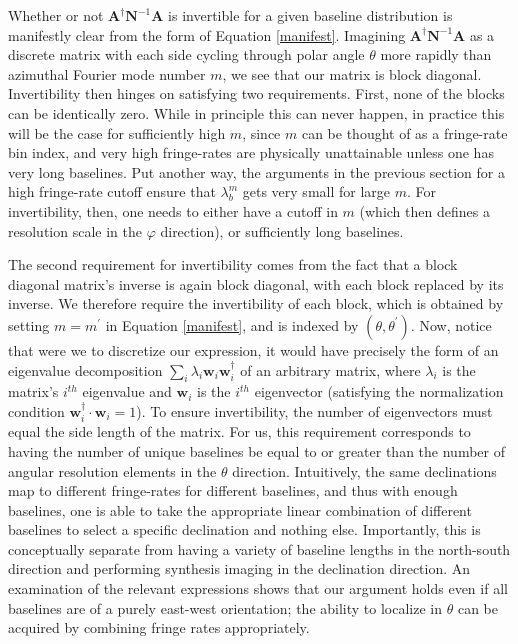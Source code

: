 \documentclass[twocolumn,apj,numberedappendix]{emulateapj}
\newcommand{\A}{\mathbf{A}}
\newcommand{\N}{\mathbf{N}}
\begin{document}
Whether or not $\A^\dagger \N^{-1} \A$ is invertible for a given baseline
distribution is manifestly clear from the form of Equation \eqref{manifest}.
Imagining $\A^\dagger \N^{-1} \A$ as a discrete matrix with each side cycling
through polar angle $\theta$ more rapidly than azimuthal Fourier mode number
$m$, we see that our matrix is block diagonal.  Invertibility then hinges on
satisfying two requirements.  First, none of the blocks can be identically
zero.  While in principle this can never happen, in practice this will be the
case for sufficiently high $m$, since $m$ can be thought of as a fringe-rate
bin index, and very high fringe-rates are physically unattainable unless one
has very long baselines.  Put another way, the arguments in the previous
section for a high fringe-rate cutoff ensure that $\lambda_b^m$ gets very small
for large $m$.  For invertibility, then, one needs to either have a cutoff in
$m$ (which then defines a resolution scale in the $\varphi$ direction), or
sufficiently long baselines.

The second requirement for invertibility comes from the fact that a block
diagonal matrix's inverse is again block diagonal, with each block replaced by
its inverse.  We therefore require the invertibility of each block, which is
obtained by setting $m=m^\prime$ in Equation \eqref{manifest}, and is indexed
by $(\theta, \theta^\prime)$.  Now, notice that were we to discretize our
expression, it would have precisely the form of an eigenvalue decomposition
$\sum_i \lambda_i \mathbf{w}_i \mathbf{w}_i^\dagger$ of an arbitrary matrix,
where $\lambda_i$ is the matrix's $i^{th}$ eigenvalue and $\mathbf{w}_i$ is the
$i^{th}$ eigenvector (satisfying the normalization condition
$\mathbf{w}_i^\dagger \cdot \mathbf{w}_i = 1$).  To ensure invertibility, the
number of eigenvectors must equal the side length of the matrix.  For us, this
requirement corresponds to having the number of unique baselines be equal to or
greater than the number of angular resolution elements in the $\theta$
direction.  Intuitively, the same declinations map to different fringe-rates
for different baselines, and thus with enough baselines, one is able to take
the appropriate linear combination of different baselines to select a specific
declination and nothing else.  Importantly, this is conceptually separate from
having a variety of baseline lengths in the north-south direction and
performing synthesis imaging in the declination direction.  An examination of
the relevant expressions shows that our argument holds even if all baselines
are of a purely east-west orientation; the ability to localize in $\theta$ can
be acquired by combining fringe rates appropriately.
\end{document}
